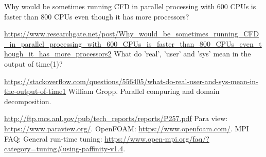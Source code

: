 \documentclass{article}
\begin{document}
\newpage
{}
\begin{thebibliography}{9} 
    \bibitem{} 
        Why would be sometimes running CFD in parallel processing with 600 CPUs is faster than 800 CPUs even though it has more processors?  

        \url{https://www.researchgate.net/post/Why_would_be_sometimes_running_CFD_in_parallel_processing_with_600_CPUs_is_faster_than_800_CPUs_even_though_it_has_more_processors2} 
        What do 'real', 'user' and 'sys' mean in the output of time(1)?

        \url{https://stackoverflow.com/questions/556405/what-do-real-user-and-sys-mean-in-the-output-of-time1}
    \bibitem{} 
        William Gropp.
        Parallel compuring and domain decomposition.

        \url{http://ftp.mcs.anl.gov/pub/tech_reports/reports/P257.pdf}
        Para view: \url{https://www.paraview.org/}.
    \bibitem{}
        OpenFOAM: \url{https://www.openfoam.com/}.
    \bibitem{}
        MPI FAQ: General run-time tuning: \url{https://www.open-mpi.org/faq/?category=tuning#using-paffinity-v1.4}.
\end{thebibliography}
\end{document}
